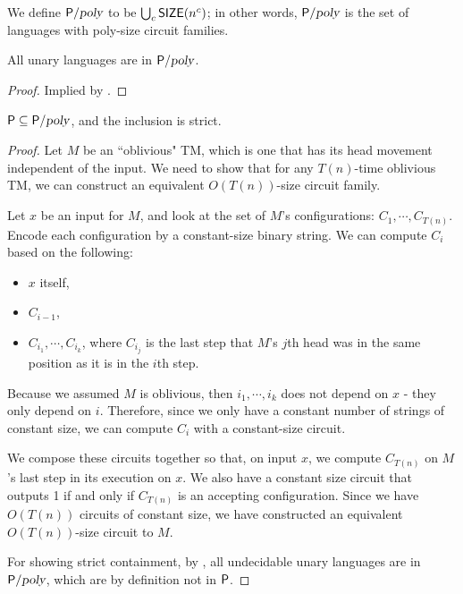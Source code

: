 \begin{definition}
We define $\Ppoly$ to be $\bigcup_{c} \SIZE(n^c)$; in other words, $\Ppoly$ is the set of languages with poly-size circuit families.
\end{definition}

\begin{theorem}
\label{thm:all_unary_ppoly}
All unary languages are in $\Ppoly$.
\end{theorem}

\begin{proof}
Implied by .
\end{proof}

\begin{theorem}
\label{thm:p_subset_ppoly}
$\P \subseteq \Ppoly$, and the inclusion is strict.
\end{theorem}

\begin{proof}
Let $M$ be an ``oblivious" TM, which is one that has its head movement independent of the input. We need to show that for any $T(n)$-time oblivious TM, we can construct an equivalent $O(T(n))$-size circuit family. 

\par Let $x$ be an input for $M$, and look at the set of $M$'s configurations: $C_1, \cdots, C_{T(n)}$. Encode each configuration by a constant-size binary string. We can compute $C_i$ based on the following:
\begin{itemize}
\item $x$ itself,
\item $C_{i-1}$,
\item $C_{i_1}, \cdots, C_{i_k}$, where $C_{i_j}$ is the last step that $M$'s $j$th head was in the same position as it is in the $i$th step.
\end{itemize}
Because we assumed $M$ is oblivious, then $i_1, \cdots, i_k$ does not depend on $x$ - they only depend on $i$. Therefore, since we only have a constant number of strings of constant size, we can compute $C_i$ with a constant-size circuit.

\par We compose these circuits together so that, on input $x$, we compute $C_{T(n)}$ on $M$'s last step in its execution on $x$. We also have a constant size circuit that outputs 1 if and only if $C_{T(n)}$ is an accepting configuration. Since we have $O(T(n))$ circuits of constant size, we have constructed an equivalent $O(T(n))$-size circuit to $M$.

\par For showing strict containment, by , all undecidable unary languages are in $\Ppoly$, which are by definition not in $\P$.
\end{proof}



